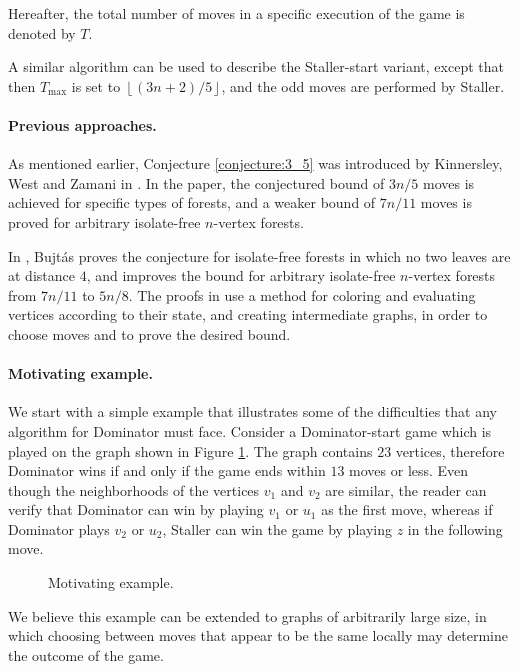 \documentclass[11pt]{article}
\theoremstyle{definition}
\begin{document}
Hereafter, the total number of moves in a specific execution of the game is denoted by $T$.

A similar algorithm can be used to describe the Staller-start variant, except that then $T_{\max}$ is set to $\left\lfloor (3n + 2) / 5 \right\rfloor$, and the odd moves are performed by Staller.

\paragraph{Previous approaches.}
As mentioned earlier, Conjecture \ref{conjecture:3_5} was introduced by Kinnersley, West and Zamani in \cite{kinnersley2013extremal}.
In the paper, the conjectured bound of $3 n / 5$ moves is achieved for specific types of forests, and a weaker bound of $7 n / 11$ moves is proved for arbitrary isolate-free $n$-vertex forests.

In \cite{bujtas2015domination}, Bujt\'as proves the conjecture for isolate-free forests in which no two leaves are at distance $4$, 
and improves the bound for arbitrary isolate-free $n$-vertex forests from $7 n / 11$ to $5 n / 8$.
The proofs in \cite{bujtas2015domination} use a method for coloring and evaluating vertices according to their state, and creating intermediate graphs, in order to choose moves and to prove the desired bound.


\paragraph{Motivating example.}
We start with a simple example that illustrates some of the difficulties that any algorithm for Dominator must face.
Consider a Dominator-start game which is played on the graph shown in Figure \ref{fig:locality_example_intro}.
The graph contains $23$ vertices, therefore Dominator wins if and only if the game ends within $13$ moves or less.
Even though the neighborhoods of the vertices $v_1$ and $v_2$ are similar, 
the reader can verify that Dominator can win by playing $v_1$ or $u_1$ as the first move, 
whereas if Dominator plays $v_2$ or $u_2$, Staller can win the game by playing $z$ in the following move.

\begin{figure}[thbp]
  \caption{\sf Motivating example.}
  \medskip
  \centering
  \label{fig:locality_example_intro}
\end{figure}

We believe this example can be extended to graphs of arbitrarily large size, in which choosing between moves that appear to be the same locally may determine the outcome of the game. 
\end{document}
